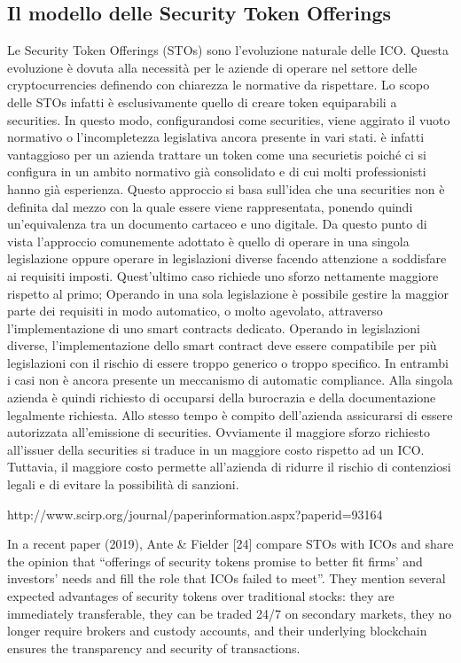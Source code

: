 \subsection{Il modello delle Security Token Offerings}
Le Security Token Offerings (STOs) sono l'evoluzione naturale delle ICO. Questa evoluzione è dovuta alla necessità per le aziende di operare nel settore delle cryptocurrencies definendo con chiarezza le normative da rispettare. Lo scopo delle STOs infatti è esclusivamente quello di creare token equiparabili a securities. In questo modo, configurandosi come securities, viene aggirato il vuoto normativo o l'incompletezza legislativa ancora presente in vari stati. è infatti vantaggioso per un azienda trattare un token come una securietis poiché ci si configura in un ambito normativo già consolidato e di cui molti professionisti hanno già esperienza. Questo approccio si basa sull'idea che una securities non è definita dal mezzo con la quale essere viene rappresentata, ponendo quindi un'equivalenza tra un documento cartaceo e uno digitale.  Da questo punto di vista l'approccio comunemente adottato è quello di operare in una singola legislazione oppure operare in legislazioni diverse facendo attenzione a soddisfare ai requisiti imposti. Quest'ultimo caso richiede uno sforzo nettamente maggiore rispetto al primo; Operando in una sola legislazione è possibile gestire la maggior parte dei requisiti in modo automatico, o molto agevolato, attraverso l'implementazione di uno smart contracts dedicato. Operando in legislazioni diverse, l'implementazione dello smart contract deve essere compatibile per più legislazioni con il rischio di essere troppo generico o troppo specifico. In entrambi i casi non è ancora presente un meccanismo di automatic compliance. Alla singola azienda è quindi richiesto di occuparsi della burocrazia e della documentazione legalmente richiesta. Allo stesso tempo è compito dell'azienda assicurarsi di essere autorizzata all'emissione di securities. Ovviamente il maggiore sforzo richiesto all'issuer della securities si traduce in un maggiore costo rispetto ad un ICO. Tuttavia, il maggiore costo permette all'azienda di ridurre il rischio di contenziosi legali e di evitare la possibilità di sanzioni. 

http://www.scirp.org/journal/paperinformation.aspx?paperid=93164

In a recent paper (2019), Ante & Fielder [24] compare STOs with ICOs and share the opinion that “offerings of security tokens promise to better fit firms’ and investors’ needs and fill the role that ICOs failed to meet”. They mention several expected advantages of security tokens over traditional stocks: they are immediately transferable, they can be traded 24/7 on secondary markets, they no longer require brokers and custody accounts, and their underlying blockchain ensures the transparency and security of transactions.



